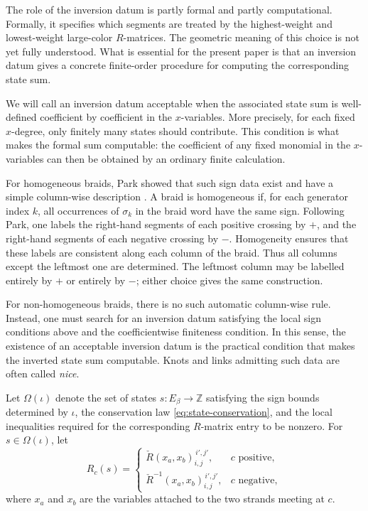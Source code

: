 \documentclass[twocolumn]{article}
\begin{document}
The role of the inversion datum is partly formal and partly computational.
Formally, it specifies which segments are treated by the highest-weight and
lowest-weight large-color \(R\)-matrices. The geometric meaning of this choice is not yet
fully understood.  What is essential for the present paper is that an inversion
datum gives a concrete finite-order procedure for computing the corresponding
state sum.

We will call an inversion datum acceptable when the associated state sum is
well-defined coefficient by coefficient in the \(x\)-variables.  More precisely,
for each fixed \(x\)-degree, only finitely many states should contribute.  This
condition is what makes the formal sum computable: the coefficient of any fixed
monomial in the \(x\)-variables can then be obtained by an ordinary finite
calculation.

For homogeneous braids, Park showed that such sign data exist and have a simple
column-wise description \cite{Park21}.  A braid is homogeneous if, for each
generator index \(k\), all occurrences of \(\sigma_k\) in the braid word have
the same sign.  Following Park, one labels the right-hand segments of each
positive crossing by \(+\), and the right-hand segments of each negative
crossing by \(-\).  Homogeneity ensures that these labels are consistent along
each column of the braid.  Thus all columns except the leftmost one are
determined.  The leftmost column may be labelled entirely by \(+\) or entirely by
\(-\); either choice gives the same construction.

For non-homogeneous braids, there is no such automatic column-wise rule.
Instead, one must search for an inversion datum satisfying the local sign
conditions above and the coefficientwise finiteness condition.  In this sense,
the existence of an acceptable inversion datum is the practical condition that
makes the inverted state sum computable.  Knots and links admitting such data are often
called \emph{nice}.

Let \(\Omega(\iota)\) denote the set of states \(s:E_\beta\to\mathbb Z\) satisfying
the sign bounds determined by \(\iota\), the conservation law
\eqref{eq:state-conservation}, and the local inequalities required for the
corresponding \(R\)-matrix entry to be nonzero.  For \(s\in\Omega(\iota)\), let
\[
  R_c(s)=
  \begin{cases}
  \check R(x_a,x_b)^{\,i',j'}_{i,j}, & c \text{ positive},\\
  \check R^{-1}(x_a,x_b)^{\,i',j'}_{i,j}, & c \text{ negative},
  \end{cases}
\]
where \(x_a\) and \(x_b\) are the variables attached to the two strands meeting
at \(c\).
\end{document}
